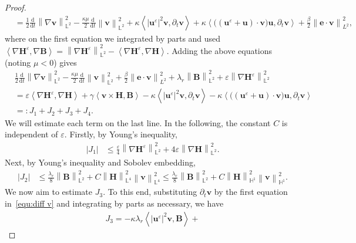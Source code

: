 \documentclass[11pt, reqno]{amsart}
\theoremstyle{definition}
\theoremstyle{remark}
\numberwithin{equation}{section}
\newcommand{\bff}{\boldsymbol}
\newcommand{\bb}{\mathbb}
\newcommand{\ddt}{\frac{\mathrm{d}}{\mathrm{d}t}}
\newcommand{\norm}[2]{\left\|{#1}\right\|_{#2}}
\newcommand{\inpro}[2]{\left\langle#1,#2\right\rangle}
\newcommand{\abs}[1]{\left|{#1}\right|}
\begin{document}
\begin{proof}
\begin{align*}
	&=
	\frac12 \ddt \norm{\nabla \bff{v}}{\bb{L}^2}^2
	-
	\frac{\kappa \mu}{2} \ddt \norm{\bff{v}}{\bb{L}^2}^2
	+
	\kappa \inpro{|\bff{u}^\varepsilon|^2 \bff{v}}{\partial_t \bff{v}}
	+
	\kappa \inpro{\big( (\bff{u}^\varepsilon+\bff{u})\cdot \bff{v} \big) \bff{u}}{\partial_t \bff{v}}
	+
	\frac{\beta}{2} \norm{\bff{e}\cdot \bff{v}}{L^2}^2,
\end{align*}
where on the first equation we integrated by parts and used $\inpro{\nabla \bff{H}^\varepsilon}{\nabla \bff{B}}= \norm{\nabla \bff{H}^\varepsilon}{\bb{L}^2}^2 - \inpro{\nabla \bff{H}^\varepsilon}{\nabla \bff{H}}$.
Adding the above equations (noting $\mu<0$) gives
\begin{align}\label{equ:add dtv B}
	&\frac12 \ddt \norm{\nabla \bff{v}}{\bb{L}^2}^2
	-
	\frac{\kappa\mu}{2} \ddt \norm{\bff{v}}{\bb{L}^2}^2
	+
	\frac{\beta}{2} \norm{\bff{e}\cdot \bff{v}}{L^2}^2
	+
	\lambda_r \norm{\bff{B}}{\bb{L}^2}^2
	+
	\varepsilon \norm{\nabla \bff{H}^\varepsilon}{\bb{L}^2}^2
	\nonumber \\
	&=
	\varepsilon \inpro{\nabla \bff{H}^\varepsilon}{\nabla \bff{H}}
	+
	\gamma \inpro{\bff{v}\times \bff{H}}{\bff{B}}
	-
	\kappa \inpro{|\bff{u}^\varepsilon|^2 \bff{v}}{\partial_t \bff{v}}
	-
	\kappa \inpro{\big( (\bff{u}^\varepsilon+\bff{u})\cdot \bff{v} \big) \bff{u}}{\partial_t \bff{v}}
	\nonumber \\
	&=: J_1+J_2+J_3+J_4.
\end{align}
We will estimate each term on the last line. In the following, the constant $C$ is independent of $\varepsilon$. Firstly, by Young's inequality,
\begin{align}\label{equ:J1}
	\abs{J_1}
	&\leq
	\frac{\varepsilon}{4} \norm{\nabla \bff{H}^\varepsilon}{\bb{L}^2}^2
	+
	4\varepsilon \norm{\nabla \bff{H}}{\bb{L}^2}^2.
\end{align}
Next, by Young's inequality and Sobolev embedding,
\begin{align}\label{equ:J2}
	\abs{J_2}
	&\leq
	\frac{\lambda_r}{8} \norm{\bff{B}}{\bb{L}^2}^2
	+
	C \norm{\bff{H}}{\bb{L}^4}^2 \norm{\bff{v}}{\bb{L}^4}^2
	\leq
	\frac{\lambda_r}{8} \norm{\bff{B}}{\bb{L}^2}^2
	+
	C \norm{\bff{H}}{\bb{H}^1}^2 \norm{\bff{v}}{\bb{H}^1}^2.
\end{align}
We now aim to estimate $J_3$. To this end, substituting $\partial_t \bff{v}$ by the first equation in~\eqref{equ:diff v} and integrating by parts as necessary, we have
\begin{align}\label{equ:L123}
	 J_3
	 =
	 -\kappa\lambda_r \inpro{|\bff{u}^\varepsilon|^2 \bff{v}}{\bff{B}}
	 +

\end{align}
\end{proof}
\end{document}
